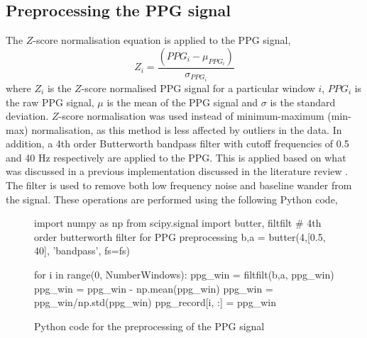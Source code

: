 \subsection{Preprocessing the PPG signal}
The $Z$-score normalisation equation is applied to the PPG signal, 
\begin{equation}
    Z_{i} = \frac{(PPG_{i} - \mu_{PPG_i}) }{\sigma_{PPG_i}}
\end{equation} \noindent where $Z_{i}$ is the $Z$-score normalised PPG signal for a particular window $i$, 
$PPG_{i}$ is the raw PPG signal, $\mu$ is the mean of the PPG signal and $\sigma$ is the standard deviation. $Z$-score 
normalisation was used instead of minimum-maximum (min-max) normalisation, as this method is less affected by outliers in the data. In addition, a 4th order 
Butterworth bandpass filter with cutoff frequencies of 0.5 and 40 Hz respectively are applied to the PPG. This is applied based on what was discussed 
in a previous implementation discussed in the literature review \cite{Nath2018}. The filter is used to 
remove both low frequency noise and baseline wander from the signal. These operations are performed using the following Python code,
\begin{figure}[H]
    \begin{python}
import numpy as np
from scipy.signal import butter, filtfilt
# 4th order butterworth filter for PPG preprocessing
b,a = butter(4,[0.5, 40], 'bandpass', fs=fs)   

for i in range(0, NumberWindows):
    ppg_win = filtfilt(b,a, ppg_win)
    ppg_win = ppg_win - np.mean(ppg_win)
    ppg_win = ppg_win/np.std(ppg_win)
    ppg_record[i, :] = ppg_win
    \end{python}
    \caption{Python code for the preprocessing of the PPG signal}
\end{figure}


